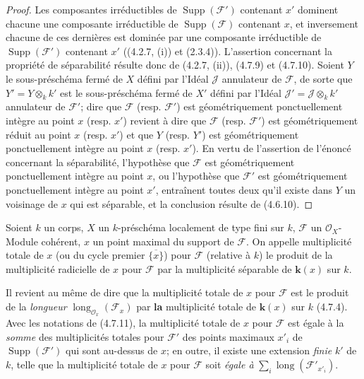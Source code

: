 \begin{proof}
Les composantes irréductibles de $\operatorname{Supp}(\mathscr F')$ contenant
$x'$ dominent chacune une composante irréductible de
$\operatorname{Supp}(\mathscr F)$ contenant $x$, et inversement chacune de
ces dernières est dominée par une composante irréductible de
$\operatorname{Supp}(\mathscr F')$ contenant $x'$ ((4.2.7, (i)) et (2.3.4)).
L'assertion concernant la propriété de séparabilité résulte donc de (4.2.7,
(ii)), (4.7.9) et (4.7.10). Soient $Y$ le sous-préschéma fermé de $X$ défini
par l'Idéal $\mathscr J$ annulateur de $\mathscr F$, de sorte que
$Y'=Y\otimes_k k'$ est le sous-préschéma fermé de $X'$ défini par l'Idéal
$\mathscr J'=\mathscr J\otimes_k k'$ annulateur de $\mathscr F'$; dire que
$\mathscr F$ (resp. $\mathscr F'$) est géométriquement ponctuellement intègre
au point $x$ (resp. $x'$) revient à dire que $\mathscr F$ (resp.
$\mathscr F'$) est géométriquement réduit au point $x$ (resp. $x'$) et que
$Y$ (resp. $Y'$) est géométriquement ponctuellement intègre au point $x$
(resp. $x'$). En vertu de l'assertion de l'énoncé concernant la séparabilité,
l'hypothèse que $\mathscr F$ est géométriquement ponctuellement intègre au
point $x$, ou l'hypothèse que $\mathscr F'$ est géométriquement ponctuellement
intègre au point $x'$, entraînent toutes deux qu'il existe dans $Y$ un
voisinage de $x$ qui est séparable, et la conclusion résulte de (4.6.10).
\end{proof}

\begin{definition}[4.7.12]
\label{IV.2.4.7.12-fr}
Soient $k$ un corps, $X$ un $k$-préschéma localement de type fini sur $k$,
$\mathscr F$ un $\mathcal O_X$-Module cohérent, $x$ un point maximal du
support de $\mathscr F$. On appelle multiplicité
totale de $x$ (ou du
cycle premier $\overline{\{x\}}$) pour $\mathscr F$ (relative à $k$) le
produit de la multiplicité radicielle de $x$ pour $\mathscr F$ par la
multiplicité séparable de $\boldsymbol{k}(x)$ sur $k$.
\end{definition}

Il revient au même de dire que la multiplicité totale de $x$ pour $\mathscr F$
est le produit de la \emph{longueur}
$\operatorname{long}_{\mathcal O_x}(\mathscr F_x)$ par \textbf{la} multiplicité totale
de $\boldsymbol{k}(x)$ sur $k$ (4.7.4). Avec les notations de (4.7.11), la multiplicité
totale de $x$ pour $\mathscr F$ est égale à la \emph{somme} des multiplicités totales
pour $\mathscr F'$ des points maximaux $x'_i$ de
$\operatorname{Supp}(\mathscr F')$ qui sont au-dessus de $x$; en outre, il
existe une extension \emph{finie} $k'$ de $k$, telle que la multiplicité totale de
$x$ pour $\mathscr F$ soit \emph{égale à}
$\sum_i\operatorname{long}(\mathscr F'_{x'_i})$.

